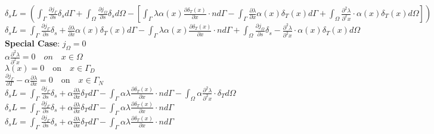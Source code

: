 \documentclass[10pt]{article} %
\begin{document}
\begin{center}
	$\delta_s L = \left( \int_\Gamma \frac{\partial j_\Gamma}{\partial s}\delta_s d\Gamma + \int_\Omega \frac{\partial j_\Omega}{\partial s}\delta_s d\Omega - \left[\int_\Gamma \lambda \alpha(x) \frac{\partial \delta_T(x)}{\partial x} \cdot n d\Gamma - \int_\Gamma \frac{\partial \lambda}{\partial x} \alpha(x) \delta_T(x) d\Gamma + \int_\Omega \frac{\partial^2 \lambda}{\partial^2 x} \cdot \alpha(x) \delta_T(x) d\Omega \right] \right)  $\\
	$\delta_s L = \int_\Gamma \frac{\partial j_\Gamma}{\partial s}\delta_s + \frac{\partial \lambda}{\partial x} \alpha(x) \delta_T(x)d\Gamma - \int_\Gamma \lambda \alpha(x) \frac{\partial \delta_T(x)}{\partial x} \cdot n d\Gamma + \int_\Omega \frac{\partial j_\Omega}{\partial s}\delta_s - \frac{\partial^2 \lambda}{\partial^2 x} \cdot \alpha(x) \delta_T(x) d\Omega $\\
	\textbf{Special Case}: $j_\Omega = 0$\\
	$\alpha \frac{\partial^2 \lambda}{\partial^2 x} = 0 \quad on \quad x \in \Omega$\\
	$\lambda (x) = 0 \quad \text{on} \quad x\in\Gamma_D$\\
	$\frac{\partial j_\Gamma}{\partial T} - \alpha \frac{\partial \lambda}{\partial x} = 0 \quad \text{on} \quad x\in\Gamma_N$\\
	$\delta_s L = \int_\Gamma \frac{\partial j_\Gamma}{\partial s}\delta_s + \alpha\frac{\partial \lambda}{\partial x} \delta_Td\Gamma - \int_\Gamma \alpha \lambda \frac{\partial \delta_T(x)}{\partial x} \cdot n d\Gamma - \int_\Omega \alpha \frac{\partial^2 \lambda}{\partial^2 x} \cdot  \delta_T d\Omega $\\
	$\delta_s L = \int_\Gamma \frac{\partial j_\Gamma}{\partial s}\delta_s + \alpha\frac{\partial \lambda}{\partial x} \delta_Td\Gamma - \int_\Gamma \alpha \lambda \frac{\partial \delta_T(x)}{\partial x} \cdot n d\Gamma $\\
	$\delta_s L = \int_\Gamma \frac{\partial j_\Gamma}{\partial s}\delta_s + \alpha \frac{\partial \lambda}{\partial x} \delta_Td\Gamma - \int_\Gamma \alpha \lambda \frac{\partial \delta_T(x)}{\partial x} \cdot n d\Gamma $\\
\end{center}
\end{document}
